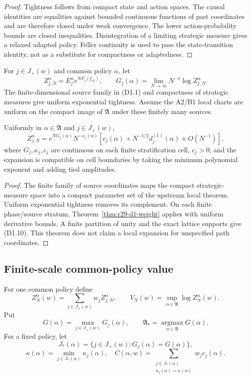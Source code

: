 \begin{proof}
Tightness follows from compact state and action spaces.  The causal identities
are equalities against bounded continuous functions of past coordinates and
are therefore closed under weak convergence.  The lower action-probability
bounds are closed inequalities.  Disintegration of a limiting strategic
measure gives a relaxed adapted policy.  Feller continuity is used to pass the
state-transition identity, not as a substitute for compactness or adaptedness.
\end{proof}

For $j\in J_+(w)$ and common policy $\alpha$, let
\[
 Z_{j,N}^\alpha
 =E_j^\alpha e^{NF_j(\xi_N)},\qquad
 G_j(\alpha)=\lim_{N\to\infty}N^{-1}\log Z_{j,N}^\alpha.  \tag{D1.9}
\]
The finite-dimensional source family in (D1.1) and compactness of strategic
measures give uniform exponential tightness.  Assume the A2/B1 local charts
are uniform on the compact image of $\mathfrak A$ under these finitely many
sources.

\begin{theorem}
\label{thm:r29-d1-uniform}
Uniformly in $\alpha\in\mathfrak A$ and $j\in J_+(w)$,
\[
 Z_{j,N}^\alpha
 =e^{NG_j(\alpha)}N^{-\kappa_j(\alpha)}
 [c_j(\alpha)+N^{-1/2}d_j^{(1)}(\alpha)+O(N^{-1})],        \tag{D1.10}
\]
where $G_j,\kappa_j,c_j$ are continuous on each finite stratification cell,
$c_j>0$, and the expansion is compatible on cell boundaries by taking the
minimum polynomial exponent and adding tied amplitudes.
\end{theorem}

\begin{proof}
The finite family of source coordinates maps the compact strategic-measure
space into a compact parameter set of the upstream local theorem.  Uniform
exponential tightness removes its complement.  On each finite phase/source
stratum, Theorem~\ref{thm:r29-d1-weight} applies with uniform derivative
bounds.  A finite partition of unity and the exact lattice supports give
(D1.10).  This theorem does not claim a local expansion for unspecified path
coordinates.
\end{proof}

\subsection{Finite-scale common-policy value}

For one common policy define
\[
 Z_N^\alpha(w)=\sum_{j\in J_+(w)}w_j Z_{j,N}^\alpha,
 \qquad V_N(w)=\sup_{\alpha\in\mathfrak A}\log Z_N^\alpha(w).            \tag{D1.11}
\]
Put
\[
 G(\alpha)=\max_{j\in J_+(w)}G_j(\alpha),\qquad
 \mathfrak A_*=
 \operatorname*{argmax}_{\alpha\in\mathfrak A}G(\alpha).               \tag{D1.12}
\]
For a fixed policy, let
\[
 J_*(\alpha)=\{j\in J_+(w):G_j(\alpha)=G(\alpha)\},       \tag{D1.13}
\]
\[
 \kappa(\alpha)=\min_{j\in J_*(\alpha)}\kappa_j(\alpha),
 \quad
 C(\alpha,w)=\sum_{\substack{j\in J_*(\alpha)\\
                     \kappa_j(\alpha)=\kappa(\alpha)}}w_jc_j(\alpha).
                                                                    \tag{D1.14}
\]

